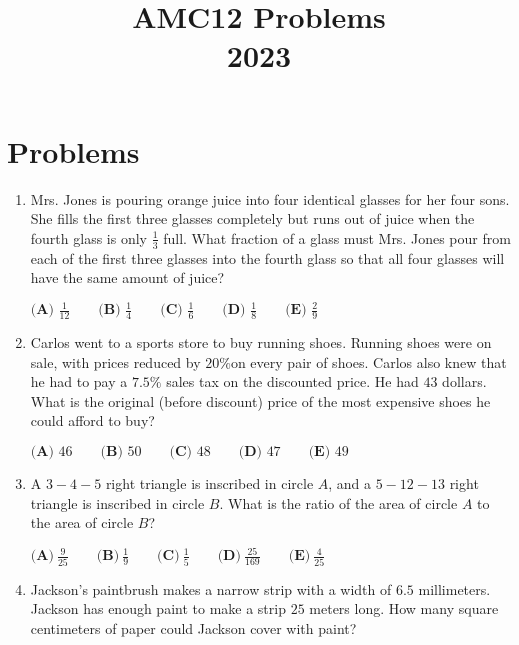 \documentclass{article}
\title{AMC12 Problems \\ 2023}
\date{}
\begin{document}
\maketitle\thispagestyle{fancy}\newpage\section*{Problems}\begin{enumerate}[label=\arabic*., itemsep=0.5em]\item Mrs. Jones is pouring orange juice into four identical glasses for her four sons. She fills the first three glasses completely but runs out of juice when the fourth glass is only $\frac{1}{3}$ full. What fraction of a glass must Mrs. Jones pour from each of the first three glasses into the fourth glass so that all four glasses will have the same amount of juice?

$\textbf{(A) }\frac{1}{12}\qquad\textbf{(B) }\frac{1}{4}\qquad\textbf{(C) }\frac{1}{6}\qquad\textbf{(D) }\frac{1}{8}\qquad\textbf{(E) }\frac{2}{9}$\par \vspace{0.5em}\item Carlos went to a sports store to buy running shoes. Running shoes were on sale, with prices reduced by $20\%$on every pair of shoes. Carlos also knew that he had to pay a $7.5\%$ sales tax on the discounted price. He had $43$ dollars. What is the original (before discount) price of the most expensive shoes he could afford to buy?

$\textbf{(A) }46\qquad\textbf{(B) }50\qquad\textbf{(C) }48\qquad\textbf{(D) }47\qquad\textbf{(E) }49$\par \vspace{0.5em}\item A $3-4-5$ right triangle is inscribed in circle $A$, and a $5-12-13$ right triangle is inscribed in circle $B$. What is the ratio of the area of circle $A$ to the area of circle $B$?

$\textbf{(A)}~\frac{9}{25}\qquad\textbf{(B)}~\frac{1}{9}\qquad\textbf{(C)}~\frac{1}{5}\qquad\textbf{(D)}~\frac{25}{169}\qquad\textbf{(E)}~\frac{4}{25}$\par \vspace{0.5em}\item Jackson's paintbrush makes a narrow strip with a width of $6.5$ millimeters. Jackson has enough paint to make a strip $25$ meters long. How many square centimeters of paper could Jackson cover with paint?


\end{enumerate}
\end{document}
